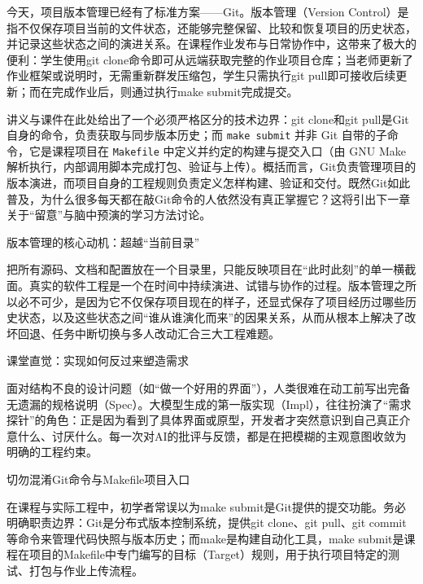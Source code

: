 \documentclass[UTF8,a4paper,11pt,fontset=fandol]{ctexart}
\begin{document}
今天，项目版本管理已经有了标准方案——Git。版本管理（Version Control）是指不仅保存项目当前的文件状态，还能够完整保留、比较和恢复项目的历史状态，并记录这些状态之间的演进关系。在课程作业发布与日常协作中，这带来了极大的便利：学生使用git clone命令即可从远端获取完整的作业项目仓库；当老师更新了作业框架或说明时，无需重新群发压缩包，学生只需执行git pull即可接收后续更新；而在完成作业后，则通过执行make submit完成提交。

讲义与课件在此处给出了一个必须严格区分的技术边界：git clone和git pull是Git自身的命令，负责获取与同步版本历史；而 \texttt{make submit} 并非 Git 自带的子命令，它是课程项目在 \texttt{Makefile} 中定义并约定的构建与提交入口（由 GNU Make 解析执行，内部调用脚本完成打包、验证与上传）。概括而言，Git负责管理项目的版本演进，而项目自身的工程规则负责定义怎样构建、验证和交付。既然Git如此普及，为什么很多每天都在敲Git命令的人依然没有真正掌握它？这将引出下一章关于“留意”与脑中预演的学习方法讨论。

\begin{importantbox}{版本管理的核心动机：超越“当前目录”}

把所有源码、文档和配置放在一个目录里，只能反映项目在“此时此刻”的单一横截面。真实的软件工程是一个在时间中持续演进、试错与协作的过程。版本管理之所以必不可少，是因为它不仅保存项目现在的样子，还显式保存了项目经历过哪些历史状态，以及这些状态之间“谁从谁演化而来”的因果关系，从而从根本上解决了改坏回退、任务中断切换与多人改动汇合三大工程难题。

\end{importantbox}

\begin{knowledgebox}{课堂直觉：实现如何反过来塑造需求}

面对结构不良的设计问题（如“做一个好用的界面”），人类很难在动工前写出完备无遗漏的规格说明（Spec）。大模型生成的第一版实现（Impl），往往扮演了“需求探针”的角色：正是因为看到了具体界面或原型，开发者才突然意识到自己真正介意什么、讨厌什么。每一次对AI的批评与反馈，都是在把模糊的主观意图收敛为明确的工程约束。

\end{knowledgebox}

\begin{warningbox}{切勿混淆Git命令与Makefile项目入口}

在课程与实际工程中，初学者常误以为make submit是Git提供的提交功能。务必明确职责边界：Git是分布式版本控制系统，提供git clone、git pull、git commit等命令来管理代码快照与版本历史；而make是构建自动化工具，make submit是课程在项目的Makefile中专门编写的目标（Target）规则，用于执行项目特定的测试、打包与作业上传流程。

\end{warningbox}
\end{document}
